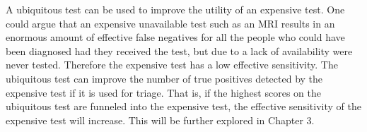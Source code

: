 A ubiquitous test can be used to improve the utility of an expensive test.  One could argue that an expensive unavailable test such as an MRI results in an enormous amount of effective false negatives for all the people who could have been diagnosed had they received the test, but due to a lack of availability were never tested.  Therefore the expensive test has a low effective sensitivity.  The ubiquitous test can improve the number of true positives detected by the expensive test if it is used for triage.  That is, if the highest scores on the ubiquitous test are funneled into the expensive test, the effective sensitivity of the expensive test will increase.  This will be further explored in Chapter 3.



